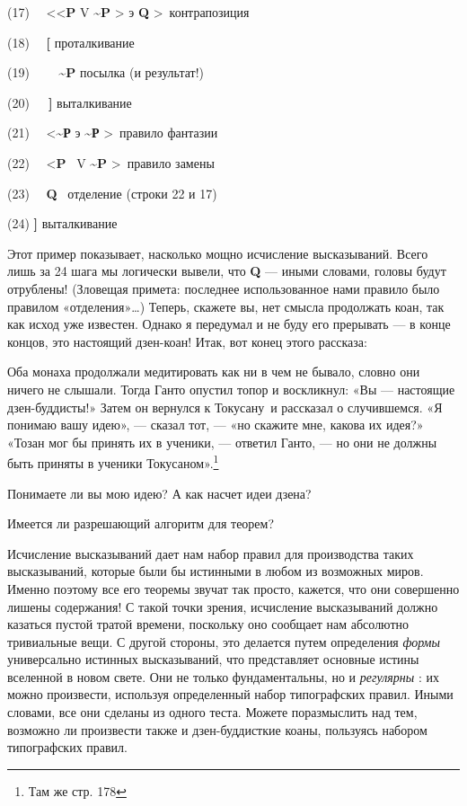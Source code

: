 (17)~~ \textless\textless{}\textbf{P} V \textbf{\textasciitilde P} \textgreater{} э \textbf{Q} \textgreater~контрапозиция

(18)~~ \textbf{{[}} проталкивание

(19)~~~~ \textbf{\textasciitilde P} посылка (и результат!)

(20)~~~\textbf{{]}} выталкивание

(21)~~ \textless{}\textbf{\textasciitilde Р} э \textbf{\textasciitilde Р} \textgreater~правило фантазии

(22)~~ \textless{}\textbf{P} ~V \textbf{\textasciitilde P} \textgreater~правило замены

(23)~~ \textbf{Q} ~отделение (строки 22 и 17)

(24) \textbf{{]}} выталкивание

Этот пример показывает, насколько мощно исчисление высказываний. Всего лишь за 24 шага мы логически вывели, что \textbf{Q} --- иными словами, головы будут отрублены! (Зловещая примета: последнее использованное нами правило было правилом «отделения»\ldots) Теперь, скажете вы, нет смысла продолжать коан, так как исход уже известен. Однако я передумал и не буду его прерывать --- в конце концов, это настоящий дзен-коан! Итак, вот конец этого рассказа:

Оба монаха продолжали медитировать как ни в чем не бывало, словно они ничего не слышали. Тогда Ганто опустил топор и воскликнул: «Вы --- настоящие дзен-буддисты!» Затем он вернулся к Токусану~и рассказал о случившемся. «Я понимаю вашу идею», --- сказал тот, --- «но скажите мне, какова их идея?» «Тозан мог бы принять их в ученики, --- ответил Ганто, --- но они не должны быть приняты в ученики Токусаном».\footnote{Там же стр. 178}

Понимаете ли вы мою идею? А как насчет идеи дзена?

Имеется ли разрешающий алгоритм для теорем?

Исчисление высказываний дает нам набор правил для производства таких высказываний, которые были бы истинными в любом из возможных миров. Именно поэтому все его теоремы звучат так просто, кажется, что они совершенно лишены содержания! С такой точки зрения, исчисление высказываний должно казаться пустой тратой времени, поскольку оно сообщает нам абсолютно тривиальные вещи. С другой стороны, это делается путем определения \emph{формы} универсально истинных высказываний, что представляет основные истины вселенной в новом свете. Они не только фундаментальны, но и \emph{регулярны} : их можно произвести, используя определенный набор типографских правил. Иными словами, все они сделаны из одного теста. Можете поразмыслить над тем, возможно ли произвести также и дзен-буддисткие коаны, пользуясь набором типографских правил.

